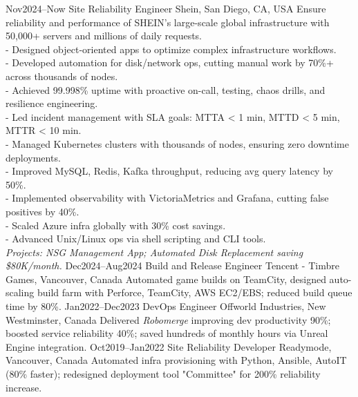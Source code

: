 \documentclass[9pt]{developercv}
\begin{document}


\begin{entrylist}
  \entry
    {Nov2024--Now}
    {Site Reliability Engineer}
    {Shein, San Diego, CA, USA}
    {
      Ensure reliability and performance of SHEIN’s large-scale global infrastructure with 50,000+ servers and millions of daily requests.\\
      - Designed object-oriented apps to optimize complex infrastructure workflows.\\
      - Developed automation for disk/network ops, cutting manual work by 70\%+ across thousands of nodes.\\
      - Achieved 99.998\% uptime with proactive on-call, testing, chaos drills, and resilience engineering.\\
      - Led incident management with SLA goals: MTTA < 1 min, MTTD < 5 min, MTTR < 10 min.\\
      - Managed Kubernetes clusters with thousands of nodes, ensuring zero downtime deployments.\\
      - Improved MySQL, Redis, Kafka throughput, reducing avg query latency by 50\%.\\
      - Implemented observability with VictoriaMetrics and Grafana, cutting false positives by 40\%.\\
      - Scaled Azure infra globally with 30\% cost savings.\\
      - Advanced Unix/Linux ops via shell scripting and CLI tools.\\
      \textit{Projects: NSG Management App; Automated Disk Replacement saving \$80K/month.}
    }
  \entry
    {Dec2024--Aug2024}
    {Build and Release Engineer}
    {Tencent - Timbre Games, Vancouver, Canada}
    {
      Automated game builds on TeamCity, designed auto-scaling build farm with Perforce, TeamCity, AWS EC2/EBS; reduced build queue time by 80\%.
    }
  \entry
    {Jan2022--Dec2023}
    {DevOps Engineer}
    {Offworld Industries, New Westminster, Canada}
    {
      Delivered \textit{Robomerge} improving dev productivity 90\%; boosted service reliability 40\%; saved hundreds of monthly hours via Unreal Engine integration.
    }
  \entry
    {Oct2019--Jan2022}
    {Site Reliability Developer}
    {Readymode, Vancouver, Canada}
    {
      Automated infra provisioning with Python, Ansible, AutoIT (80\% faster); redesigned deployment tool "Committee" for 200\% reliability increase.
}
\end{entrylist}
\end{document}
